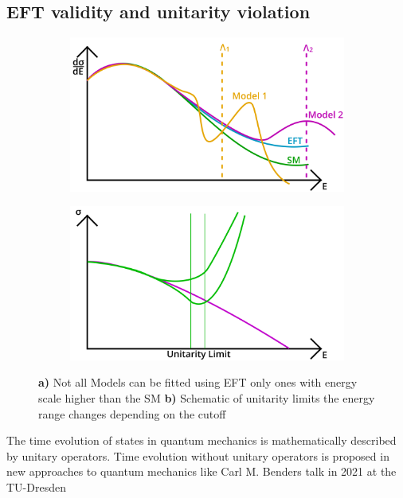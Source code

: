 \documentclass[../Bachelorarbeit.tex]{subfiles}
\begin{document}
\subsection{EFT validity and unitarity violation}
\begin{figure}[h]
    \centering
    \begin{subfigure}{0.45\textwidth}
        \centering
        \includegraphics[width=\textwidth]{images/EFT_validity.png}
        \caption{}
    \end{subfigure}
    \begin{subfigure}{0.45\textwidth}
        \centering
        \includegraphics[width=\textwidth]{images/EFT_cross_section.png}
        \caption{}
    \end{subfigure}
    \caption{\textbf{a)} Not all Models can be fitted using EFT only ones with energy scale higher than the SM \textbf{b)} Schematic of unitarity limits the energy range changes depending on the cutoff \cite{MSz} }
    \label{fig:EFT_validity}
\end{figure}
The time evolution of states in quantum mechanics is mathematically described by unitary operators. Time evolution without unitary operators is proposed in new approaches to quantum mechanics like Carl M. Benders talk in 2021 at the TU-Dresden
\end{document}
